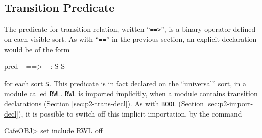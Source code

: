 \documentclass[a4paper]{memoir}
\begin{document}
%

\subsection{Transition Predicate}\label{sec:p2-transition-pred}

The predicate for transition relation, written ``\verb|==>|'',
\index{\texttt{==>}} is a binary
operator defined on each visible sort. As with ``\verb|==|'' in the
previous section, an explicit declaration would be of the form
\begin{vvtm}
\begin{ccode}
   pred _==>_ : S S
\end{ccode}
\end{vvtm}
for each sort \verb|S|. This predicate is in fact declared on
the ``universal'' sort, in a module called \verb|RWL|.
\verb|RWL| is imported implicitly, when a module contains
transition declarations (Section \ref{sec:p2-trans-decl}).
As with \verb|BOOL| (Section \ref{sec:p2-import-decl}), it is
possible to switch off this implicit importation, by the command
\begin{vvtm}
\begin{ccode}
  CafeOBJ> set include RWL off
\end{ccode}
\end{vvtm}
\end{document}
